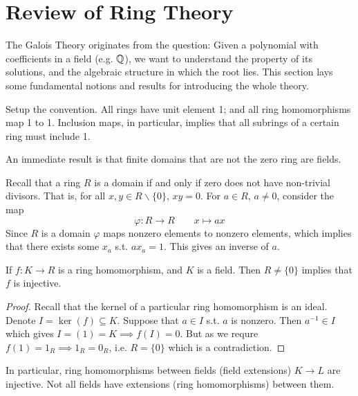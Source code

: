 \section{Review of Ring Theory}

\textstart
The Galois Theory originates from the question: Given a polynomial with coefficients in a field (e.g. $\mathbb{Q}$), we want to understand the property of its solutions, and the algebraic structure in which the root lies. This section lays some fundamental notions and results for introducing the whole theory.

Setup the convention. All rings have unit element 1; and all ring homomorphisms map 1 to 1. Inclusion maps, in particular, implies that all subrings of a certain ring must include 1.

\begin{remark}
    An immediate result is that finite domains that are not the zero ring are fields.

    Recall that a ring $R$ is a domain if and only if zero does not have non-trivial divisors. That is, for all $x, y \in R \smallsetminus \{0\}$, $xy = 0$. For $a \in R$, $a \neq 0$, consider the map 
    \[
        \varphi: R \to R \qquad x \mapsto ax
    \]
    Since $R$ is a domain $\varphi$ maps nonzero elements to nonzero elements, which implies that there exists some $x_a$ s.t. $a x_a = 1$. This gives an inverse of $a$.
\end{remark}

\begin{proposition}\label{prop: ring homs from a field are injective}
    If $f: K \to R$ is a ring homomorphism, and $K$ is a field. Then $R \neq \{0\}$ implies that $f$ is injective.
\end{proposition}

\begin{proof}
    Recall that the kernel of a particular ring homomorphism is an ideal. Denote $I = \ker (f) \subseteq K$. Suppose that $a \in I$ s.t. $a$ is nonzero. Then $a^{-1} \in I$ which gives $I = (1) = K \implies f(I) = 0$. But as we requre $f(1) = 1_R \implies 1_R = 0_R$, i.e. $R = \{0\}$ which is a contradiction.
\end{proof}

\begin{corollary}
    In particular, ring homomorphisms between fields (field extensions) $K \to L$ are injective. Not all fields have extensions (ring homomorphisms) between them.
\end{corollary}

